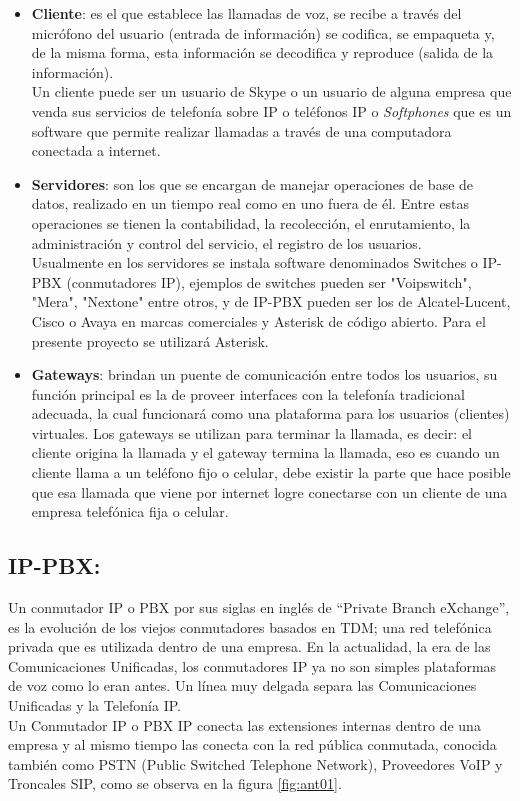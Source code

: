 \documentclass[conference]{IEEEtran}
\begin{document}
\begin{itemize}
\item \textbf{Cliente}: es el que establece las llamadas de voz, se recibe a través del micrófono del usuario (entrada de información) se codifica, se empaqueta y, de la misma forma, esta información se decodifica y reproduce (salida de la información).\\
Un cliente puede ser un usuario de Skype o un usuario de alguna empresa que venda sus servicios de telefonía sobre IP o teléfonos IP o \textit{Softphones} que es un software que permite realizar llamadas a través de una computadora conectada a internet.

\item \textbf{Servidores}: son los que se encargan de manejar operaciones de base de datos, realizado en un tiempo real como en uno fuera de él. Entre estas operaciones se tienen la contabilidad, la recolección, el enrutamiento, la administración y control del servicio, el registro de los usuarios.\\
Usualmente en los servidores se instala software denominados Switches o IP-PBX (conmutadores IP), ejemplos de switches pueden ser "Voipswitch", "Mera", "Nextone" entre otros, y de IP-PBX pueden ser los de Alcatel-Lucent, Cisco o Avaya en marcas comerciales y Asterisk de código abierto. Para el presente proyecto se utilizará Asterisk.
\item \textbf{Gateways}: brindan un puente de comunicación entre todos los usuarios, su función principal es la de proveer interfaces con la telefonía tradicional adecuada, la cual funcionará como una plataforma para los usuarios (clientes) virtuales. Los gateways se utilizan para terminar la llamada, es decir: el cliente origina la llamada y el gateway termina la llamada, eso es cuando un cliente llama a un teléfono fijo o celular, debe existir la parte que hace posible que esa llamada que viene por internet logre conectarse con un cliente de una empresa telefónica fija o celular.
\end{itemize}
\subsection{\textbf{ IP-PBX:}}  
Un conmutador IP o PBX por sus siglas en inglés de “Private Branch eXchange”, es la evolución de los viejos conmutadores basados en TDM; una red telefónica privada que es utilizada dentro de una empresa. En la actualidad, la era de las Comunicaciones Unificadas, los conmutadores IP ya no son simples plataformas de voz como lo eran antes. Un línea muy delgada separa las Comunicaciones Unificadas y la Telefonía IP.\\
Un Conmutador IP o PBX IP conecta las extensiones internas dentro de una empresa y al mismo tiempo las conecta con la red pública conmutada, conocida también como PSTN (Public Switched Telephone Network), Proveedores VoIP y Troncales SIP, como se observa en la figura \ref{fig:ant01}.
\end{document}
